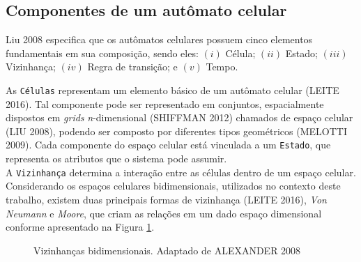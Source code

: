 \documentclass[a4paper,12pt]{article}
\begin{document}
\newpage
\subsection{Componentes de um autômato celular}
Liu 2008 \cite{Liu2008} especifica que os autômatos celulares possuem cinco elementos fundamentais em sua composição, sendo eles: $(i)$ Célula; $(ii)$ Estado; $(iii)$ Vizinhança; $(iv)$ Regra de transição; e $(v)$ Tempo.

As \texttt{Células} representam um elemento básico de um autômato celular (LEITE 2016\cite{Leite2016}). Tal componente pode ser representado em conjuntos, espacialmente dispostos em \textit{grids} \textit{n}-dimensional (SHIFFMAN 2012\cite{Shiffman2012}) chamados de espaço celular (LIU 2008\cite{Liu2008}), podendo ser composto por diferentes tipos geométricos (MELOTTI 2009\cite{Melotti2009}). Cada componente do espaço celular está vinculada a um \texttt{Estado}, que representa os atributos que o sistema pode assumir.\\

A \texttt{Vizinhança} determina a interação entre as células dentro de um espaço celular. Considerando os espaços celulares bidimensionais, utilizados no contexto deste trabalho, existem duas principais formas de vizinhança (LEITE 2016\cite{Leite2016}), \textit{Von Neumann} e \textit{Moore}, que criam as relações em um dado espaço dimensional conforme apresentado na Figura \ref{figure:neighbor}.

\begin{figure}[!ht]
\centering
{}
\qquad
{}
\qquad
\caption{Vizinhanças bidimensionais. Adaptado de ALEXANDER 2008\cite{alexanderschatten2008}}
\label{figure:neighbor}
\end{figure}
\end{document}
